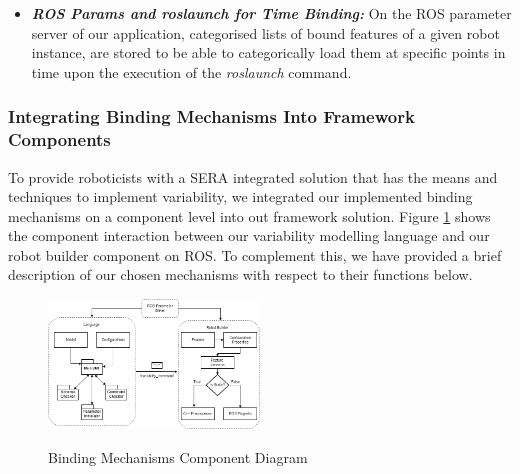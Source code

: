 \documentclass[conference]{IEEEtran}
\newcommand{\foot}[1]{\footnote{\url{#1}}}
\begin{document}
\begin{itemize}
\begin{listing}[H]
\begin{verbatim}
		PLUGINLIB_EXPORT_CLASS(motivml_plugins::Hands, plugin_base::PluginInterface)
		
		PLUGINLIB_EXPORT_CLASS(
		motivml_plugins::Pointscloud, plugin_base::PluginInterface)
		
		PLUGINLIB_EXPORT_CLASS(
		static_integration::Amclros, static_base::StaticInterface)
		\end{verbatim}
		\label{pluginlib-dynamic}
	\end{listing}

To simulate dynamic binding in general, we used the ROS pluginlib package to encapsulate feature classes as plugins. Our choice to use ROS pluginlib was influenced by the fact that it is lightweight, robust, highly optimised and easy to integrate as a third party library. In addition, it comes with a very intuitive documentation\foot{http://wiki.ros.org/pluginlib} backed by an active community of contributors.

Listing \ref{pluginlib-dynamic} demonstrates how the ROS version of the pluginlib library is used to export classes that can later be consumed by programs as plugins.

\item \textit{\textbf{ROS Params and roslaunch for Time Binding:}} On the ROS parameter server of our application, categorised lists of bound features of a given robot instance, are stored to be able to categorically load them at specific points in time upon the execution of the \textit{roslaunch} command.
\end{itemize}
\subsubsection{Integrating Binding Mechanisms Into Framework Components}
To provide roboticists with a SERA integrated solution that has the means
and techniques to implement variability, we integrated our implemented binding mechanisms on a component level into out framework solution.  Figure \ref{mecha-compo} shows the component interaction between our variability modelling language and our robot builder component on ROS. To complement this, we have provided a brief description of our chosen mechanisms with respect to their functions below.

\begin{figure}[H]
	\caption{Binding Mechanisms Component Diagram}
	\centering
	\includegraphics[width=0.5\textwidth]{diagrams/mecha-compo.png}
	\label{mecha-compo}
\end{figure}
\end{document}
